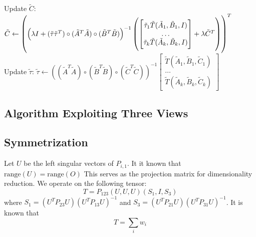 \documentclass{article}
\def\range{\text{range}}
\begin{document}
\begin{algorithm}
\begin{algorithmic}[H]
\STATE Update $\tilde C$: $\tilde C \gets \del{\del{\lambda I + (\tilde \tau \tilde \tau^T) \circ (\tilde A^T \tilde A) \circ (\tilde B^T \tilde B)}^{-1} \del{\begin{bmatrix} \tilde\tau_1 \tilde T(\tilde A_1, \tilde B_1, I) \\ \ldots \\ \tilde\tau_k \tilde T(\tilde A_k, \tilde B_k, I) \end{bmatrix} + \lambda {\tilde C}^T}}^T$
\STATE Update $\tilde \tau$: $\tilde \tau \gets ((\tilde A^T \tilde A) \circ (\tilde B^T \tilde B) \circ (\tilde C^T \tilde C))^{-1}  \begin{bmatrix} \tilde T(\tilde A_1, \tilde B_1, \tilde C_1) \\ \ldots \\ \tilde T(\tilde A_k, \tilde B_k, \tilde C_k) \end{bmatrix}$
\ENDFOR
\end{algorithmic}
\end{algorithm}

\subsection{Algorithm Exploiting Three Views}

\subsection{Symmetrization }

Let $U$ be the left singular vectors of $P_{i,1}$. It it known that $\range(U) = \range(O)$
This serves as the projection matrix for dimensionality reduction.
We operate on the following tensor:
\[ T = P_{123}(U,U,U)(S_1, I, S_3) \]
where $S_1 = (U^T P_{23} U)(U^T P_{13} U)^{-1}$ and $S_3 = (U^T P_{21} U)(U^T P_{31} U)^{-1}$.
It is known that
\[ T = \sum_i w_i \]
\end{document}

